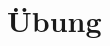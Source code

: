 \documentclass[language=de,theme=light]{assignment}
\begin{document}
\section{Übung}
\end{document}
